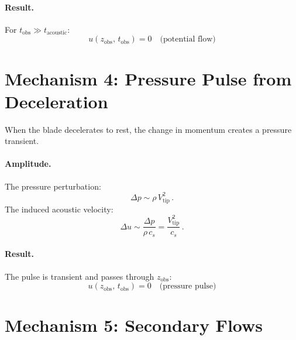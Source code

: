 \documentclass[11pt,a4paper]{article}
\begin{document}
\paragraph{Result.}
For $t_\mathrm{obs} \gg t_\mathrm{acoustic}$:
\begin{equation}
  \boxed{u(z_\mathrm{obs},\, t_\mathrm{obs}) = 0
    \quad \text{(potential flow)}}
\end{equation}


\section{Mechanism 4: Pressure Pulse from Deceleration}
\label{sec:pressure}

When the blade decelerates to rest, the change in momentum creates a
pressure transient.

\paragraph{Amplitude.}
The pressure perturbation:
\begin{equation}
  \Delta p \sim \rho\, V_\mathrm{tip}^2\,.
  \label{eq:dp}
\end{equation}
The induced acoustic velocity:
\begin{equation}
  \Delta u \sim \frac{\Delta p}{\rho\, c_s}
            = \frac{V_\mathrm{tip}^2}{c_s}\,.
  \label{eq:du_acoustic}
\end{equation}

\paragraph{Result.}
The pulse is transient and passes through $z_\mathrm{obs}$:
\begin{equation}
  \boxed{u(z_\mathrm{obs},\, t_\mathrm{obs}) = 0
    \quad \text{(pressure pulse)}}
\end{equation}


\section{Mechanism 5: Secondary Flows}
\label{sec:secondary}
\end{document}
